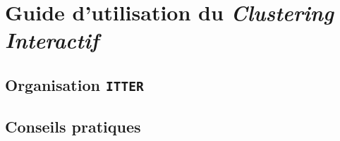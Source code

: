 \chapter{Guide d'utilisation du \textit{Clustering Interactif}}
\label{chapter:5-GUIDE}

	\section{Organisation \texttt{ITTER}}
		\label{section:5.1-GUIDE-ITTER}
	
	
	\section{Conseils pratiques}
		\label{section:5.2-GUIDE-CONSEILS}
